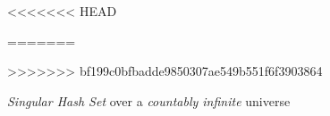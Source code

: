 \documentclass[ ../main.tex]{subfiles}
\begin{document}

\begin{figure}
    \centering
<<<<<<< HEAD
    
=======
    
>>>>>>> bf199c0bfbadde9850307ae549b551f6f3903864
    \caption{\emph{Singular Hash Set} over a \emph{countably infinite} universe}
    \label{fig:my_label}
\end{figure}
\end{document}
